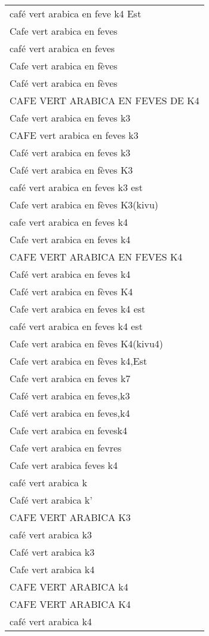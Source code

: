 \documentclass[
]{book}
\begin{document}
\begin{longtable}[t]{l}
café vert arabica en feve k4 Est\\
Cafe vert arabica en feves\\
café vert arabica en feves\\
\addlinespace
Cafe vert arabica en fèves\\
Café vert arabica en fèves\\
CAFE VERT ARABICA EN FEVES DE K4\\
Cafe vert arabica en feves k3\\
CAFE vert arabica en feves k3\\
\addlinespace
Café vert arabica en feves k3\\
Café vert arabica en fèves K3\\
café vert arabica en feves k3 est\\
Cafe vert arabica en fèves K3(kivu)\\
cafe vert arabica en feves k4\\
\addlinespace
Cafe vert arabica en feves k4\\
CAFE VERT ARABICA EN FEVES K4\\
Café vert arabica en feves k4\\
Café vert arabica en fèves K4\\
Cafe vert arabica en feves k4 est\\
\addlinespace
café vert arabica en feves k4 est\\
Cafe vert arabica en fèves K4(kivu4)\\
Cafe vert arabica en fèves k4,Est\\
Cafe vert arabica en feves k7\\
Café vert arabica en feves,k3\\
\addlinespace
Café vert arabica en feves,k4\\
Cafe vert arabica en fevesk4\\
Cafe vert arabica en fevres\\
Cafe vert arabica feves k4\\
café vert arabica k\\
\addlinespace
Café vert arabica k'\\
CAFE VERT ARABICA K3\\
café vert arabica k3\\
Café vert arabica k3\\
Cafe vert arabica k4\\
\addlinespace
CAFE VERT ARABICA k4\\
CAFE VERT ARABICA K4\\
café vert arabica k4\\

\end{longtable}
\end{document}
